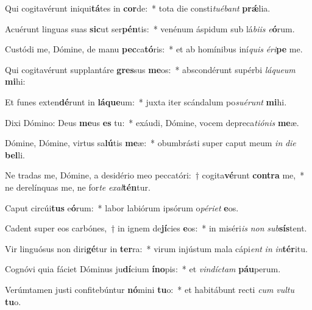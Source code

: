 \item Qui cogitavérunt iniqui\textbf{tá}tes in \textbf{cor}de:~* tota die consti\textit{tu}\textit{é}\textit{bant} \textbf{prǽ}lia.
\item Acuérunt linguas suas \textbf{sic}ut ser\textbf{pén}tis:~* venénum áspidum sub lá\textit{bi}\textit{is} \textit{e}\textbf{ó}rum.
\item Custódi me, Dómine, de manu \textbf{pec}ca\textbf{tó}ris:~* et ab homínibus iní\textit{quis} \textit{é}\textit{ri}\textbf{pe} me.
\item Qui cogitavérunt supplantáre \textbf{gres}sus \textbf{me}os:~* abscondérunt supérbi \textit{lá}\textit{que}\textit{um} \textbf{mi}hi:
\item Et funes exten\textbf{dé}runt in \textbf{lá}\textbf{que}um:~* juxta iter scándalum po\textit{su}\textit{é}\textit{runt} \textbf{mi}hi.
\item Dixi Dómino: Deus \textbf{me}us \textbf{es} tu:~* exáudi, Dómine, vocem depreca\textit{ti}\textit{ó}\textit{nis} \textbf{me}æ.
\item Dómine, Dómine, virtus sa\textbf{lú}tis \textbf{me}æ:~* obumbrásti super caput meum \textit{in} \textit{di}\textit{e} \textbf{bel}li.
\item Ne tradas me, Dómine, a desidério meo peccatóri:~† cogita\textbf{vé}runt \textbf{con}\textbf{tra} me,~* ne derelínquas me, ne for\textit{te} \textit{ex}\textit{al}\textbf{tén}tur.
\item Caput circúi\textbf{tus} e\textbf{ó}rum:~* labor labiórum ipsórum o\textit{pé}\textit{ri}\textit{et} \textbf{e}os.
\item Cadent super eos carbónes,~† in ignem de\textbf{jí}cies \textbf{e}os:~* in miséri\textit{is} \textit{non} \textit{sub}\textbf{sís}tent.
\item Vir linguósus non diri\textbf{gé}tur in \textbf{ter}ra:~* virum injústum mala cápi\textit{ent} \textit{in} \textit{in}\textbf{tér}itu.
\item Cognóvi quia fáciet Dóminus ju\textbf{dí}cium \textbf{ín}\textbf{o}pis:~* et \textit{vin}\textit{díc}\textit{tam} \textbf{páu}perum.
\item Verúmtamen justi confitebúntur \textbf{nó}mini \textbf{tu}o:~* et habitábunt recti \textit{cum} \textit{vul}\textit{tu} \textbf{tu}o.
